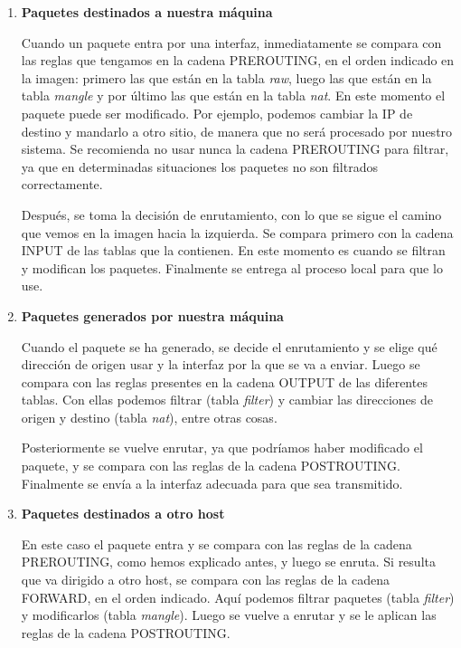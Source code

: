\begin{enumerate}[label=\bfseries\arabic*.]
\item \textbf{Paquetes destinados a nuestra máquina}

Cuando un paquete entra por una interfaz, inmediatamente se compara con las reglas que tengamos en la cadena PREROUTING, en el orden indicado en la imagen: primero las que están en la tabla \textit{raw}, luego las que están en la tabla \textit{mangle} y por último las que están en la tabla \textit{nat}. En este momento el paquete puede ser modificado. Por ejemplo, podemos cambiar la IP de destino y mandarlo a otro sitio, de manera que no será procesado por nuestro sistema. Se recomienda no usar nunca la cadena PREROUTING para filtrar, ya que en determinadas situaciones los paquetes no son filtrados correctamente.

Después, se toma la decisión de enrutamiento, con lo que se sigue el camino que vemos en la imagen hacia la izquierda. Se compara primero con la cadena INPUT de las tablas que la contienen. En este momento es cuando se filtran y modifican los paquetes. Finalmente se entrega al proceso local para que lo use.\\

\item \textbf{Paquetes generados por nuestra máquina}

Cuando el paquete se ha generado, se decide el enrutamiento y se elige qué dirección de origen usar y la interfaz por la que se va a enviar. Luego se compara con las reglas presentes en la cadena OUTPUT de las diferentes tablas. Con ellas podemos filtrar (tabla \textit{filter}) y cambiar las direcciones de origen y destino (tabla \textit{nat}), entre otras cosas.

Posteriormente se vuelve enrutar, ya que podríamos haber modificado el paquete, y se compara con las reglas de la cadena POSTROUTING. Finalmente se envía a la interfaz adecuada para que sea transmitido.\\

\item \textbf{Paquetes destinados a otro host}

En este caso el paquete entra y se compara con las reglas de la cadena PREROUTING, como hemos explicado antes, y luego se enruta. Si resulta que va dirigido a otro host, se compara con las reglas de la cadena FORWARD, en el orden indicado. Aquí podemos filtrar paquetes (tabla \textit{filter}) y modificarlos (tabla \textit{mangle}). Luego se vuelve a enrutar y se le aplican las reglas de la cadena POSTROUTING.

\end{enumerate}



